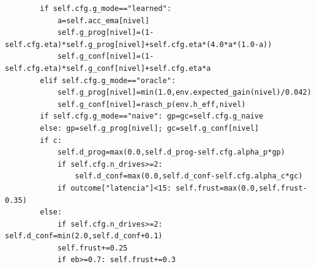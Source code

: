 \documentclass{article}
\begin{document}
\begin{verbatim}
        if self.cfg.g_mode=="learned":
            a=self.acc_ema[nivel]
            self.g_prog[nivel]=(1-self.cfg.eta)*self.g_prog[nivel]+self.cfg.eta*(4.0*a*(1.0-a))
            self.g_conf[nivel]=(1-self.cfg.eta)*self.g_conf[nivel]+self.cfg.eta*a
        elif self.cfg.g_mode=="oracle":
            self.g_prog[nivel]=min(1.0,env.expected_gain(nivel)/0.042)
            self.g_conf[nivel]=rasch_p(env.h_eff,nivel)
        if self.cfg.g_mode=="naive": gp=gc=self.cfg.g_naive
        else: gp=self.g_prog[nivel]; gc=self.g_conf[nivel]
        if c:
            self.d_prog=max(0.0,self.d_prog-self.cfg.alpha_p*gp)
            if self.cfg.n_drives>=2:
                self.d_conf=max(0.0,self.d_conf-self.cfg.alpha_c*gc)
            if outcome["latencia"]<15: self.frust=max(0.0,self.frust-0.35)
        else:
            if self.cfg.n_drives>=2: self.d_conf=min(2.0,self.d_conf+0.1)
            self.frust+=0.25
            if eb>=0.7: self.frust+=0.3
\end{verbatim}
\end{document}
